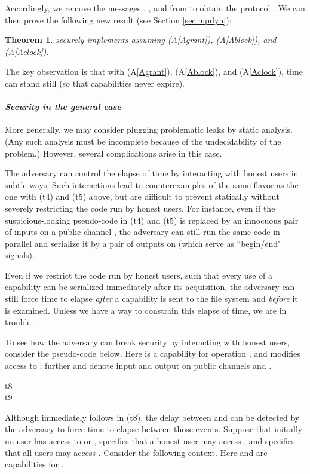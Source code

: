 \documentclass[10pt]{article}
\newtheorem{theorem}{Theorem}
\newenvironment{mylist}
    {\begin{list}{}{\setlength{\leftmargin}{0.5cm}}}
    {\end{list}}
\begin{document}
Accordingly, we remove the messages , , and  from  to obtain the protocol . We can then prove the following new result (see Section \ref{sec:mpdyn}):
\begin{theorem}  securely implements  assuming {\rm (A\ref{Agrant})}, {\rm (A\ref{Ablock})}, and {\rm (A\ref{Aclock})}.
\end{theorem}
\noindent
The key observation is that with (A\ref{Agrant}), (A\ref{Ablock}), and (A\ref{Aclock}), time can stand still (so that capabilities never expire). 

\paragraph{\em Security in the general case}
More generally, we may consider plugging problematic leaks by static analysis. (Any such analysis must be incomplete because of the undecidability of the problem.) However, several  complications arise in this case. 
\begin{mylist}
\item The adversary can control the elapse of time by interacting with honest users in subtle ways. Such interactions lead to counterexamples of the same flavor as the one with (t4) and (t5) above, but are difficult to prevent statically without severely restricting the code run by honest users. For instance, even if the suspicious-looking pseudo-code  in (t4) and (t5) is replaced by an innocuous pair of inputs on a public channel , the adversary can still run the same code in parallel and serialize it by a pair of outputs on  (which serve as ``begin/end" signals).
\item Even if we restrict the code run by honest users, such that every use of a capability can be serialized immediately after its acquisition, the adversary can still force time to elapse \emph{after} a capability is sent to the file system and \emph{before} it is examined. Unless we have a way to constrain this elapse of time, we are in trouble. 
\end{mylist}
To see how the adversary can break security by interacting with honest users, consider the  pseudo-code below. Here  is a capability for operation , and  modifies access to ; further  and  denote input and output on public channels  and . 
\begin{description}
\item[t8] 
\item[t9] 
\end{description}
Although  immediately follows  in (t8), the delay between  and  can be detected by the adversary to force time to elapse between those events. Suppose that initially no user has access to  or ,  specifies that a honest user  may access , and  specifies that all users may access . Consider the following context. Here  and  are capabilities for .
\end{document}
